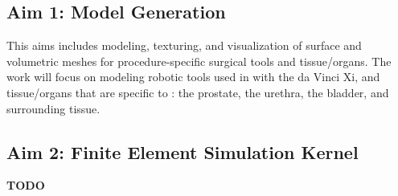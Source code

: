 \subsection{Aim 1: Model Generation}

This aims includes modeling, texturing, and visualization of  surface and volumetric meshes for procedure-specific surgical tools and tissue/organs. The work will focus on modeling robotic tools used in  with the da Vinci Xi, and tissue/organs that are specific to  : the prostate, the urethra, the bladder, and surrounding tissue.

\subsection{Aim 2: Finite Element Simulation Kernel}

\textbf{TODO}

